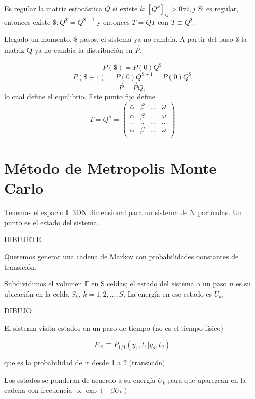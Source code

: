 \documentclass[10pt,oneside]{CBFT_book}
\begin{document}
Es regular la matriz estocástica $ Q $ si existe $ k : [ Q^k ]_{ij} > 0 \forall i,j $
Si es regular, entonces existe $ \$ : Q^\$ =  Q^{\$+1} $ y entonces $T = QT$ con $T\equiv Q^\$$.

Llegado un momento, $\$$ pasos, el sistema ya no cambia. A partir del paso $\$$ la matriz Q ya no cambia
la distribución en $\vec{P}$.


\[
	P(\$) = P(0) Q^\$
\]
\[
	P(\$+1) = P(0) Q^{\$+1} = P(0) Q^\$
\]
\[
	\vec{P} = \vec{P} Q,
\]
lo cual define el equilibrio. Este punto fijo define
\[
	T = Q^s = \begin{pmatrix}
	         \alpha & \beta & ... & \omega \\
	         \alpha & \beta & ... & \omega \\
	         .. & .. & ... & .. \\
	         \alpha & \beta & ... & \omega \\
	        \end{pmatrix}
\]

\section{Método de Metropolis Monte Carlo}

Tenemos el espacio $ \mathbb{\Gamma} $ 3DN dimensional para un sistema de N partículas.
Un punto es el estado del sistema.

DIBUJETE

Queremos generar una cadena de Markov con probabilidades constantes de transición.

Subdividimos el volumen $ \mathbb{\Gamma} $  en S celdas; el estado del sistema a un paso $n$ es su
ubicación en la celda $S_k$, $k=1,2,...,S$. La energía en ese estado es $U_k$.

DIBUJO 

El sistema visita estados en un paso de tiempo (no es el tiempo físico)

\[
	P_{12} \equiv P_{1/1}( y_1, t_1 | y_2, t_2 )
\]

que es la probabilidad de ir desde 1 a 2 (transición)

Los estados se ponderan de acuerdo a su energía $U_k$ para que aparezcan en la cadena con frecuencia
$ \propto \exp(-\beta U_k ) $
\end{document}
